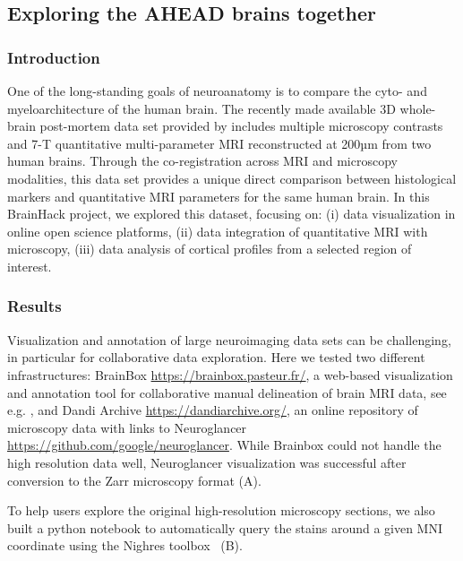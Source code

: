 \documentclass[../main.tex]{subfiles}
\begin{document}
\subsection{Exploring the AHEAD brains together}


\subsubsection{Introduction}
One of the long-standing goals of neuroanatomy is to compare the cyto- and myeloarchitecture of the human brain. The recently made available 3D whole-brain post-mortem data set provided by \textcite{Alkemade2022} includes multiple microscopy contrasts and 7-T quantitative multi-parameter MRI reconstructed at 200µm from two human brains. Through the co-registration across MRI and microscopy modalities, this data set provides a unique direct comparison between histological markers and quantitative MRI parameters for the same human brain. In this BrainHack project, we explored this dataset, focusing on: (i) data visualization in online open science platforms, (ii) data integration of quantitative MRI with microscopy, (iii) data analysis of cortical profiles from a selected region of interest. 


\subsubsection{Results}

Visualization and annotation of large neuroimaging data sets can be challenging, in particular for collaborative data exploration. Here we tested two different infrastructures: BrainBox \url{https://brainbox.pasteur.fr/}, a web-based visualization and annotation tool for collaborative manual delineation of brain MRI data, see e.g. \parencite{heuer_evolution_2019}, and Dandi Archive \url{https://dandiarchive.org/}, an online repository of microscopy data with links to Neuroglancer \url{https://github.com/google/neuroglancer}. While Brainbox could not handle the high resolution data well, Neuroglancer visualization was successful after conversion to the Zarr microscopy format (A).

To help users explore the original high-resolution microscopy sections, we also built a python notebook to automatically query the stains around a given MNI coordinate using the Nighres toolbox~\parencite{huntenburg_nighres_2018} (B).
\end{document}
